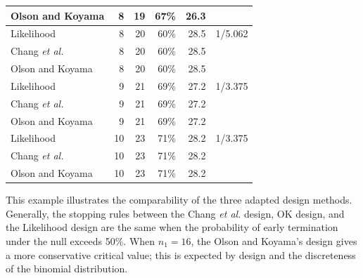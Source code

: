 \documentclass[12pt]{report}\usepackage[]{graphicx}\usepackage[]{color}
\newlength{\li}\setlength{\li}{14.48pt}
\newlength{\di}\setlength{\di}{-3.5mm}
\begin{document}
\begin{table}[]
\begin{tabular}{|L|R|R|R|R|L|}
Olson and Koyama & 8     & 19    & 67\%           & 26.3          &                                                                                    \\ \hline
Likelihood       & 8     & 20    & 60\%           & 28.5          & 1/5.062                                                                            \\ \hline
Chang \textit{et al.}           & 8     & 20    & 60\%           & 28.5          &                                                                                    \\ \hline
Olson and Koyama & 8     & 20    & 60\%           & 28.5          &                                                                                    \\ \hline
Likelihood       & 9     & 21    & 69\%           & 27.2          & 1/3.375                                                                            \\ \hline
Chang \textit{et al.}         & 9     & 21    & 69\%           & 27.2          &                                                                                    \\ \hline
Olson and Koyama & 9     & 21    & 69\%           & 27.2          &                                                                                    \\ \hline
Likelihood       & 10    & 23    & 71\%           & 28.2          & 1/3.375                                                                            \\ \hline
Chang \textit{et al.}  & 10    & 23    & 71\%           & 28.2          &                                                                                    \\ \hline
Olson and Koyama & 10    & 23    & 71\%           & 28.2          &                                                                                    \\ \hline
\end{tabular}
\hspace*{-0.1cm}
\end{table}

This example illustrates the comparability of the three adapted design methods. Generally, the stopping rules between the Chang \textit{et al.} design, OK design, and the Likelihood design are the same when the probability of early termination under the null exceeds 50\%. When $n_1 = 16$, the Olson and Koyama's design gives a more conservative critical value; this is expected by design and the discreteness of the binomial distribution. 
\end{document}
